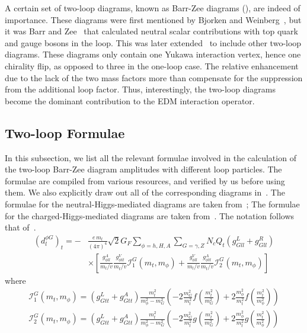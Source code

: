 A certain set of two-loop diagrams, known as Barr-Zee diagrams (), are indeed of importance.
These diagrams were first mentioned by Bjorken and Weinberg~\cite{BjorkenWeinberg1977TwoLoop},
but it was Barr and Zee~\cite{BarrZee1990TwoLoop} that calculated neutral scalar contributions with top quark and gauge bosons in the loop.
This was later extended~\cite{Leigh1991EDM,Chang1991EDM,Kao1992EDM,BowserChao1997EDM,Abe2016EDM} to include other two-loop diagrams.
These diagrams only contain one Yukawa interaction vertex, hence one chirality flip, as opposed to three in the one-loop case.
The relative enhancement due to the lack of the two mass factors more than compensate for the suppression from the additional loop factor.
Thus, interestingly, the two-loop diagrams become the dominant contribution to the EDM interaction operator.

\subsection{Two-loop Formulae}
In this subsection, we list all the relevant formulae involved in the calculation of the two-loop Barr-Zee diagram amplitudes with different loop particles.
The formulae are compiled from various resources, and verified by us before using them.
We also explicitly draw out all of the corresponding diagrams in~.
The formulae for the neutral-Higgs-mediated diagrams are taken from~\cite{Abe2016EDM};
The formulae for the charged-Higgs-mediated diagrams are taken from~\cite{BowserChao1997EDM}.
The notation follows that of~\cite{Abe2016EDM}.
\begin{align}\label{eq:BarrZee-phiG-toploop}
	(d^{\phi G}_{l})_{t} = -&\frac{e\,m_{l}}{(4\pi)^{4}}\sqrt{2}G_{F}\sum_{\phi=h,H,A}\sum_{G=\gamma,Z}N_{c}Q_{t}(g_{Gll}^{L}+g_{Gll}^{R}) \nonumber \\
	& \times \left[\frac{g_{\phi ll}^{A}}{m_{l}/v}\frac{g_{\phi tt}^{V}}{m_{t}/v}\mathcal{I}_{1}^{G}(m_{t}, m_{\phi}) + \frac{g_{\phi ll}^{V}}{m_{l}/v}\frac{g_{\phi tt}^{A}}{m_{t}/v}\mathcal{I}_{2}^{G}(m_{t}, m_{\phi})\right]
\end{align}
where
\begin{align}
	\mathcal{I}_{1}^{G}(m_{t},m_{\phi}) = (g_{Gtt}^{L}+g_{Gtt}^{A})\frac{m_{t}^{2}}{m_{\phi}^{2}-m_{G}^{2}}
	\left(-2\frac{m_{G}^{2}}{m_{t}^{2}} f\left(\frac{m_{t}^{2}}{m_{G}^{2}}\right) + 2\frac{m_{\phi}^{2}}{m_{t}^{2}} f\left(\frac{m_{t}^{2}}{m_{\phi}^{2}}\right)\right) \nonumber \\
	\mathcal{I}_{2}^{G}(m_{t},m_{\phi}) = (g_{Gtt}^{L}+g_{Gtt}^{A})\frac{m_{t}^{2}}{m_{\phi}^{2}-m_{G}^{2}}
	\left(-2\frac{m_{G}^{2}}{m_{t}^{2}} g\left(\frac{m_{t}^{2}}{m_{G}^{2}}\right) + 2\frac{m_{\phi}^{2}}{m_{t}^{2}} g\left(\frac{m_{t}^{2}}{m_{\phi}^{2}}\right)\right)
\end{align}

